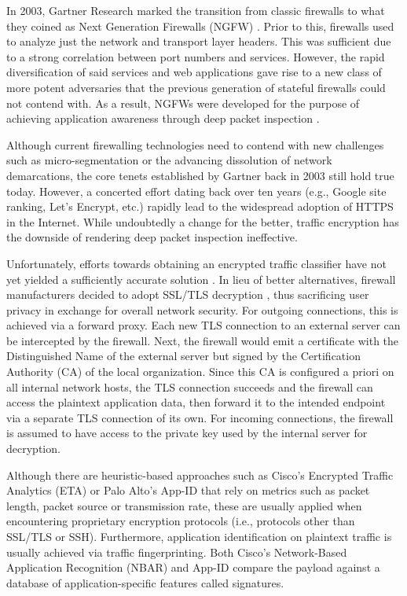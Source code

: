 In 2003, Gartner Research marked the transition from classic firewalls to what they coined as Next Generation Firewalls (NGFW) \cite{stiennon2003paths}. Prior to this, firewalls used to analyze just the network and transport layer headers. This was sufficient due to a strong correlation between port numbers and services. However, the rapid diversification of said services and web applications gave rise to a new class of more potent adversaries that the previous generation of stateful firewalls could not contend with. As a result, NGFWs were developed for the purpose of achieving application awareness through deep packet inspection \cite{el2017survey}.

Although current firewalling technologies need to contend with new challenges such as micro-segmentation \cite{sheikh2021zero} or the advancing dissolution of network demarcations, the core tenets established by Gartner back in 2003 still hold true today. However, a concerted effort dating back over ten years (e.g., Google site ranking, Let's Encrypt, etc.) rapidly lead to the widespread adoption of HTTPS in the Internet. While undoubtedly a change for the better, traffic encryption has the downside of rendering deep packet inspection ineffective.

Unfortunately, efforts towards obtaining an encrypted traffic classifier have not yet yielded a sufficiently accurate solution \cite{husak2016https}. In lieu of better alternatives, firewall manufacturers decided to adopt SSL/TLS decryption \cite{radivilova2018decrypting}, thus sacrificing user privacy in exchange for overall network security. For outgoing connections, this is achieved via a forward proxy. Each new TLS connection to an external server can be intercepted by the firewall. Next, the firewall would emit a certificate with the Distinguished Name of the external server but signed by the Certification Authority (CA) of the local organization. Since this CA is configured a priori on all internal network hosts, the TLS connection succeeds and the firewall can access the plaintext application data, then forward it to the intended endpoint via a separate TLS connection of its own. For incoming connections, the firewall is assumed to have access to the private key used by the internal server for decryption.

Although there are heuristic-based approaches such as Cisco's Encrypted Traffic Analytics (ETA) \cite{manning2020aceta} or Palo Alto's App-ID \cite{malmgren2016comparative} that rely on metrics such as packet length, packet source or transmission rate, these are usually applied when encountering proprietary encryption protocols (i.e., protocols other than SSL/TLS or SSH). Furthermore, application identification on plaintext traffic is usually achieved via traffic fingerprinting. Both Cisco's Network-Based Application Recognition (NBAR) and App-ID compare the payload against a database of application-specific features called signatures.

